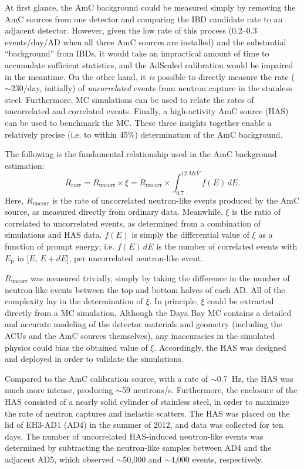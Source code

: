 \documentclass[../thesis.tex]{subfiles}
\begin{document}
At first glance, the AmC background could be measured simply by removing the AmC sources from one detector and comparing the IBD candidate rate to an adjacent detector. However, given the low rate of this process (0.2--0.3 events/day/AD when all three AmC sources are installed) and the substantial ``background'' from IBDs, it would take an impractical amount of time to accumulate sufficient statistics, and the AdScaled calibration would be impaired in the meantime. On the other hand, it \emph{is} possible to directly measure the rate ($\sim$230/day, initially) of \emph{uncorrelated} events from neutron capture in the stainless steel. Furthermore, MC simulations can be used to relate the rates of uncorrelated and correlated events. Finally, a high-activity AmC source (HAS) can be used to benchmark the MC. These three insights together enable a relatively precise (i.e. to within 45\%) determination of the AmC background.

The following is the fundamental relationship used in the AmC background estimation:
\begin{equation*}
  R_{\mathrm{corr}} = R_{\mathrm{uncorr}} \times \xi = R_{\mathrm{uncorr}} \times \int_{0.7}^{\SI{12}{MeV}} f(E)\,dE.
\end{equation*}
Here, $R_{\mathrm{uncorr}}$ is the rate of uncorrelated neutron-like events produced by the AmC source, as measured directly from ordinary data. Meanwhile, $\xi$ is the ratio of correlated to uncorrelated events, as determined from a combination of simulations and HAS data. $f(E)$ is simply the differential value of $\xi$ as a function of prompt energy; i.e. $f(E)\,dE$ is the number of correlated events with $E_{\mathrm{p}}$ in [$E$, $E + dE$], per uncorrelated neutron-like event.

$R_{\mathrm{uncorr}}$ was measured trivially, simply by taking the difference in the number of neutron-like events between the top and bottom halves of each AD. All of the complexity lay in the determination of $\xi$. In principle, $\xi$ could be extracted directly from a MC simulation. Although the Daya Bay MC contains a detailed and accurate modeling of the detector materials and geometry (including the ACUs and the AmC sources themselves), any inaccuracies in the simulated physics could bias the obtained value of $\xi$. Accordingly, the HAS was designed and deployed in order to validate the simulations.

Compared to the AmC calibration source, with a rate of $\sim$0.7~Hz, the HAS was much more intense, producing $\sim$59 neutrons/s. Furthermore, the enclosure of the HAS consisted of a nearly solid cylinder of stainless steel, in order to maximize the rate of neutron captures and inelastic scatters. The HAS was placed on the lid of EH3-AD1 (AD4) in the summer of 2012, and data was collected for ten days. The number of uncorrelated HAS-induced neutron-like events was determined by subtracting the neutron-like samples between AD4 and the adjacent AD5, which observed $\sim$50,000 and $\sim$4,000 events, respectively.
\end{document}
